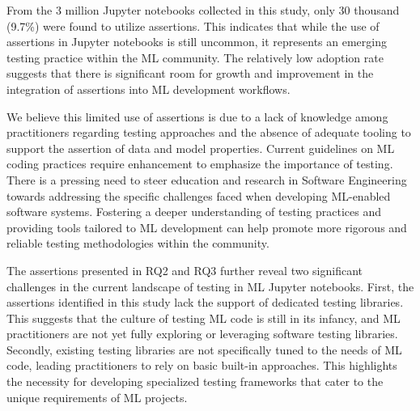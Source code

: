 


From the 3 million Jupyter notebooks collected in this study, only 30 thousand (9.7\%) were found to utilize assertions. This indicates that while the use of assertions in Jupyter notebooks is still uncommon, it represents an emerging testing practice within the ML community. The relatively low adoption rate suggests that there is significant room for growth and improvement in the integration of assertions into ML development workflows.

We believe this limited use of assertions is due to a lack of knowledge among practitioners regarding testing approaches and the absence of adequate tooling to support the assertion of data and model properties. Current guidelines on ML coding practices require enhancement to emphasize the importance of testing. There is a pressing need to steer education and research in Software Engineering towards addressing the specific challenges faced when developing ML-enabled software systems. Fostering a deeper understanding of testing practices and providing tools tailored to ML development can help promote more rigorous and reliable testing methodologies within the community.

The assertions presented in RQ2 and RQ3 further reveal two significant challenges in the current landscape of testing in ML Jupyter notebooks. First, the assertions identified in this study lack the support of dedicated testing libraries. This suggests that the culture of testing ML code is still in its infancy, and ML practitioners are not yet fully exploring or leveraging software testing libraries. Secondly, existing testing libraries are not specifically tuned to the needs of ML code, leading practitioners to rely on basic built-in approaches. This highlights the necessity for developing specialized testing frameworks that cater to the unique requirements of ML projects.

